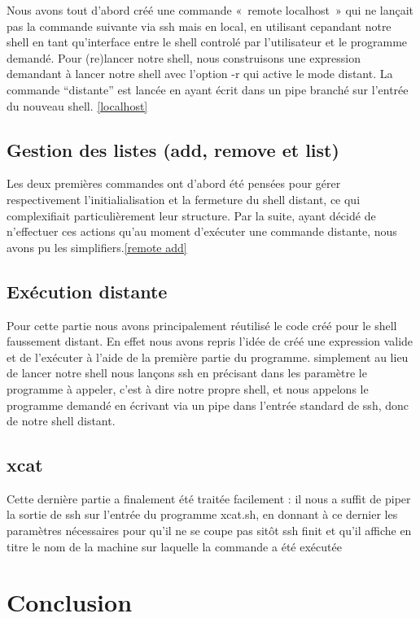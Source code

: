 \documentclass[12pt]{article}
\begin{document}
Nous avons tout d'abord créé une commande «~remote localhost~» qui ne lançait pas la commande
suivante via ssh mais en local, en utilisant cepandant notre shell en tant qu'interface entre le shell
controlé par l'utilisateur et le programme demandé. Pour (re)lancer notre shell, nous construisons une
expression demandant à lancer notre shell avec l'option -r qui active le mode distant. La commande
“distante” est lancée en ayant écrit dans un pipe branché sur l'entrée du nouveau shell. \ref{localhost}

\subsection{Gestion des listes (add, remove et list)}

Les deux premières commandes ont d'abord été pensées pour gérer respectivement l'initialialisation
et la fermeture du shell distant, ce qui complexifiait particulièrement leur structure. Par la
suite, ayant décidé de n'effectuer ces actions qu'au moment d'exécuter une commande distante, nous
avons pu les simplifiers.\ref{remote add}

\subsection{Exécution distante}

Pour cette partie nous avons principalement réutilisé le code créé pour le shell faussement
distant. En effet nous avons repris l'idée de créé une expression valide et de l'exécuter à l'aide
de la première partie du programme. simplement au lieu de lancer notre shell nous lançons ssh en
précisant dans les paramètre le programme à appeler, c'est à dire notre propre shell, et nous appelons
le programme demandé en écrivant via un pipe dans l'entrée standard de ssh, donc de notre shell distant.

\subsection{xcat}

Cette dernière partie a finalement été traitée facilement : il nous a suffit de piper la sortie de ssh
sur l'entrée du programme xcat.sh, en donnant à ce dernier les paramètres nécessaires pour qu'il ne se coupe pas
sitôt ssh finit et qu'il affiche en titre le nom de la machine sur laquelle la commande a été exécutée




\newpage
\section{Conclusion}
\end{document}
